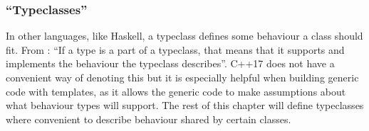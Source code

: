 

\subsubsection{``Typeclasses''}
In other languages, like Haskell, a typeclass defines some behaviour a class should fit. From \cite{learnyouahaskell}: ``If a type is a part of a typeclass, that means that it supports and implements the behaviour the typeclass describes''.
C++17 does not have a convenient way of denoting this but it is especially helpful when building generic code with templates, as it allows the generic code to make assumptions about what behaviour types will support.
The rest of this chapter will define typeclasses where convenient to describe behaviour shared by certain classes.






